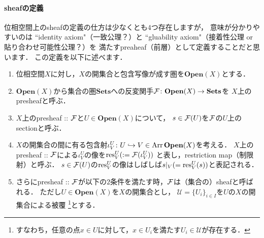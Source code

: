 \documentclass[]{jsarticle}
\newcommand{\Open}{\mathbf{Open}}
\newcommand{\Sets}{\mathbf{Sets}}
\newcommand{\covU}{\mathcal{U}}
\begin{document}
    \paragraph{sheafの定義}
    位相空間上のsheafの定義の仕方は少なくとも$4$つ存在しますが，
    意味が分かりやすいのは
    ``identity axiom"（一致公理？）と
    ``gluability axiom"（接着性公理 or 貼り合わせ可能性公理？）を
    満たすpreaheaf（前層）として定義することだと思います．
    この定義を以下に述べます．
    \begin{Def}
        \hfill \vspace{-0.8cm}
        \begin{enumerate}[label=(\roman*), leftmargin=*]
        \item 
            位相空間$X$に対し，$X$の開集合と包含写像が成す圏を$\Open(X)$とする．

        \item
            $\Open(X)$から集合の圏$\Sets$への反変関手$\shF \colon \Open(X) \to \Sets$を
            $X$上のpresheafと呼ぶ．

        \item
            $X$上のpresheaf :: $\mathcal{F}$と$U \in \Open(X)$について，
            $s \in \mathcal{F}(U)$を$\mathcal{F}$の$U$上のsectionと呼ぶ．
        
        \item
            $X$の開集合の間に有る包含射$\iota^{U}_{V} \colon U \inclmap V \in \operatorname{Arr} \Open(X)$を考える．
            $X$上のpresheaf :: $\mathcal{F}$による$\iota^{U}_{V}$の像を$\operatorname{res}^{U}_{V}(:=\mathcal{F}(\iota^{U}_{V}))$
            と表し，restriction map（制限射）と呼ぶ．
            $s \in \mathcal{F}(U)$の$\operatorname{res}^{U}_{V}$の像はしばしば$s|_{V}(=\operatorname{res}^{U}_{V}(s))$と表記される．

        \item 
            さらにpresheaf :: $\mathcal{F}$が以下の$2$条件を満たす時，$\mathcal{F}$は（集合の）sheafと呼ばれる．
            ただし$U \in \Open(X)$を$X$の開集合とし，
            $\covU=\{ U_i \}_{i \in I}$を$U$の$X$の開集合による被覆
            \footnote{ すなわち，任意の点$x \in U$に対して，$x \in U_i$を満たす$U_i \in \covU$が存在する． }とする．
\end{enumerate}
\end{Def}
\end{document}
